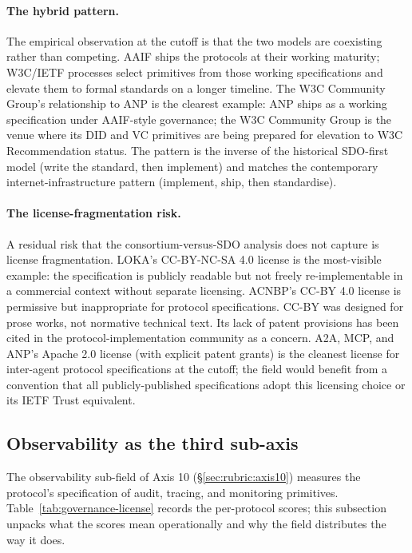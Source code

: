\paragraph{The hybrid pattern.}
The empirical observation at the cutoff is that the
two models are coexisting rather than competing. AAIF
ships the protocols at their working maturity;
W3C/IETF processes select primitives from those
working specifications and elevate them to formal
standards on a longer timeline. The W3C Community
Group's relationship to ANP is the clearest example:
ANP ships as a working specification under AAIF-style
governance; the W3C Community Group is the venue where
its DID and VC primitives are being prepared for
elevation to W3C Recommendation status. The pattern
is the inverse of the historical SDO-first model
(write the standard, then implement) and matches the
contemporary internet-infrastructure pattern
(implement, ship, then standardise).

\paragraph{The license-fragmentation risk.}
A residual risk that the consortium-versus-SDO
analysis does not capture is license fragmentation.
LOKA's CC-BY-NC-SA 4.0 license is the most-visible
example: the specification is publicly readable but
not freely re-implementable in a commercial context
without separate licensing. ACNBP's CC-BY 4.0 license
is permissive but inappropriate for protocol
specifications. CC-BY was designed for prose works,
not normative technical text. Its lack of patent
provisions has been cited in the
protocol-implementation community as a concern.
A2A, MCP, and ANP's Apache 2.0 license (with explicit
patent grants) is the cleanest license for
inter-agent protocol specifications at the cutoff;
the field would benefit from a convention that all
publicly-published specifications adopt this licensing
choice or its IETF Trust equivalent.

\subsection{Observability as the third sub-axis}
\label{sec:governance:observability}

The observability sub-field of Axis 10
(\S\ref{sec:rubric:axis10}) measures the protocol's
specification of audit, tracing, and monitoring
primitives. Table~\ref{tab:governance-license} records
the per-protocol scores; this subsection unpacks what
the scores mean operationally and why the field
distributes the way it does.


